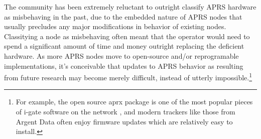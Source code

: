 The community has been extremely reluctant to outright classify APRS hardware
as misbehaving in the past,
due to the embedded nature of APRS nodes that usually precludes any major
modifications in behavior of existing nodes.
Classitying a node as misbehaving often meant that the operator would need to
spend a significant amount of time and money outright replacing the deficient hardware.
As more APRS nodes move to open-source and/or reprogramable implementations,
it's conceivable that updates to APRS behavior as resulting 
from future research may become merely difficult,
instead of utterly impossible.\footnote{For example, the open source aprx package is
	one of the most popular pieces of i-gate software on the network \cite{aprxpopular},
	and modern trackers like those from Argent Data often
enjoy firmware updates which are relatively easy to install.}

